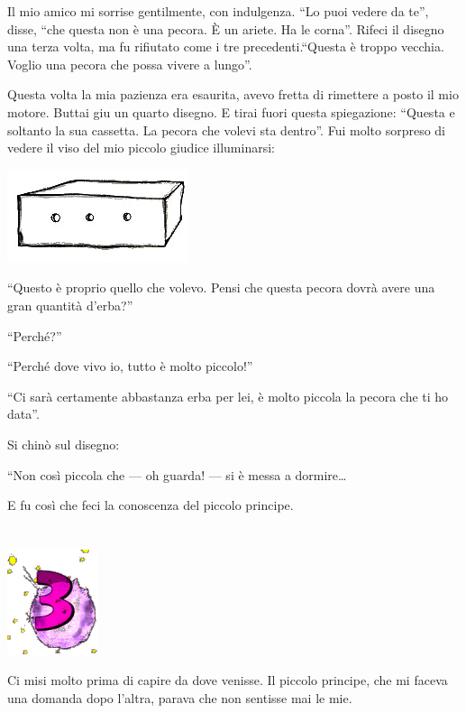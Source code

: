 \documentclass[11pt]{scrbook}
\begin{document}
Il mio amico mi sorrise gentilmente, con indulgenza. ``Lo puoi vedere da te'', disse, ``che questa non è una pecora. È un ariete. Ha le corna''. Rifeci il disegno una terza volta, ma fu rifiutato come i tre precedenti.``Questa è troppo vecchia. Voglio una pecora che possa vivere a lungo''.

Questa volta la mia pazienza era esaurita, avevo fretta di rimettere a posto il mio motore. Buttai giu un quarto disegno. E tirai fuori questa spiegazione: ``Questa e soltanto la sua cassetta. La pecora che volevi sta dentro''. Fui molto sorpreso di vedere il viso del mio piccolo giudice illuminarsi:

\begin{center}
\includegraphics{img/2e}
\end{center}

``Questo è proprio quello che volevo. Pensi che questa pecora dovrà avere una gran quantità d'erba?''

``Perché?''

``Perché dove vivo io, tutto è molto piccolo!''

``Ci sarà certamente abbastanza erba per lei, è molto piccola la pecora che ti ho data''.

Si chinò sul disegno:

``Non così piccola che --- oh guarda! --- si è messa a dormire\ldots{}

E fu così che feci la conoscenza del piccolo principe.

\chapter{}
\begin{center}
\includegraphics{img/chapter3}
\end{center}

Ci misi molto prima di capire da dove venisse. Il piccolo principe, che mi faceva una domanda dopo l'altra, parava che non sentisse mai le mie.
\end{document}

